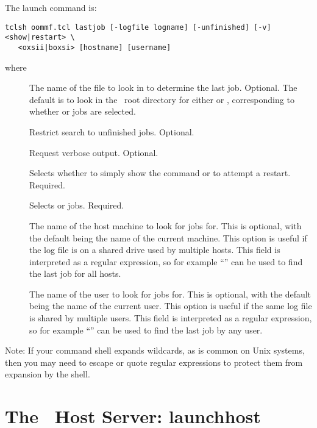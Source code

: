 The  launch command is:
\begin{verbatim}
tclsh oommf.tcl lastjob [-logfile logname] [-unfinished] [-v] <show|restart> \
   <oxsii|boxsi> [hostname] [username]
\end{verbatim}
where
\begin{description}
\item[]
The name of the file to look in to determine the last job.  Optional.
The default is to look in the \OOMMF\ root directory for either
 or , corresponding to whether
\app{oxsii} or \app{boxsi} jobs are selected.
\item[]
Restrict search to unfinished jobs.  Optional.
\item[]
Request verbose output.  Optional.
\item[]
Selects whether to simply show the command or to attempt a restart.
Required.
\item[]
Selects  or  jobs.  Required.
\item[]
The name of the host machine to look for jobs for.  This is optional,
with the default being the name of the current machine.  This option is
useful if the log file is on a shared drive used by multiple hosts.
This field is interpreted as a regular expression, so for example
``\cd{.*}'' can be used to find the last job for all hosts.
\item[]
The name of the user to look for jobs for.  This is optional,
with the default being the name of the current user.  This option is
useful if the same log file is shared by multiple users.
This field is interpreted as a regular expression, so for example
``\cd{.*}'' can be used to find the last job by any user.
\end{description}
Note: If your command shell expands wildcards, as is common on Unix
systems, then you may need to escape or quote regular expressions to
protect them from expansion by the shell.



\section{The \OOMMF\ Host Server:
   launchhost\label{sec:launchhost}}%

